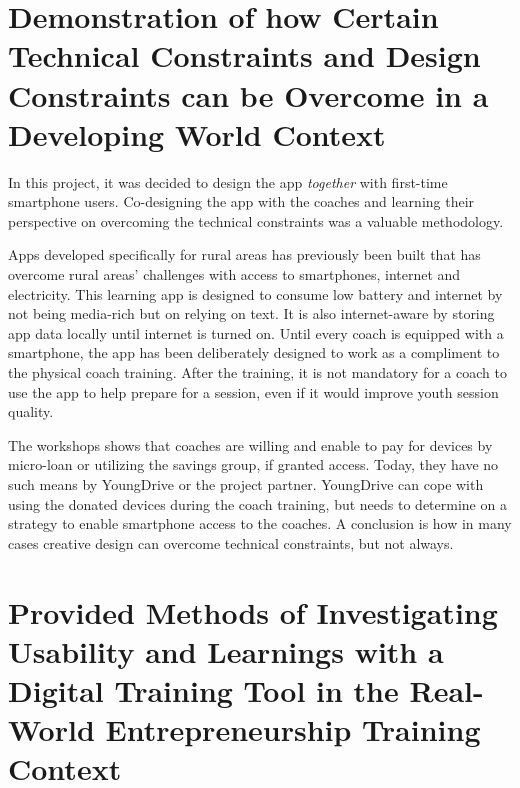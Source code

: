 \section{Demonstration of how Certain Technical Constraints and Design Constraints can be Overcome in a Developing World Context} %

In this project, it was decided to design the app \textit{together} with first-time smartphone users. Co-designing the app with the coaches and learning their perspective on overcoming the technical constraints was a valuable methodology.

Apps developed specifically for rural areas has previously been built that has overcome rural areas’ challenges with access to smartphones, internet and electricity. This learning app is designed to consume low battery and internet by not being media-rich but on relying on text. It is also internet-aware by storing app data locally until internet is turned on. Until every coach is equipped with a smartphone, the app has been deliberately designed to work as a compliment to the physical coach training. After the training, it is not mandatory for a coach to use the app to help prepare for a session, even if it would improve youth session quality.

The workshops shows that coaches are willing and enable to pay for devices by micro-loan or utilizing the savings group, if granted access. Today, they have no such means by YoungDrive or the project partner. YoungDrive can cope with using the donated devices during the coach training, but needs to determine on a strategy to enable smartphone access to the coaches. A conclusion is how in many cases creative design can overcome technical constraints, but not always.


\section{Provided Methods of Investigating Usability and Learnings with a Digital Training Tool in the Real-World Entrepreneurship Training Context} %

